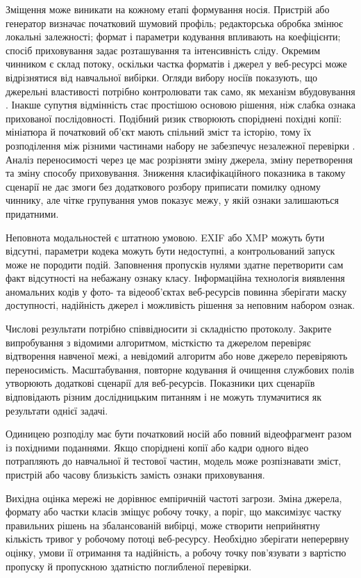 Зміщення може виникати на кожному етапі формування носія. Пристрій або генератор визначає початковий шумовий профіль; редакторська обробка змінює локальні залежності; формат і параметри кодування впливають на коефіцієнти; спосіб приховування задає розташування та інтенсивність сліду. Окремим чинником є склад потоку, оскільки частка форматів і джерел у веб-ресурсі може відрізнятися від навчальної вибірки. Огляди вибору носіїв показують, що джерельні властивості потрібно контролювати так само, як механізм вбудовування \cite{azame2025coverselection,ma2023coverselection}. Інакше супутня відмінність стає простішою основою рішення, ніж слабка ознака прихованої послідовності. Подібний ризик створюють споріднені похідні копії: мініатюра й початковий об’єкт мають спільний зміст та історію, тому їх розподілення між різними частинами набору не забезпечує незалежної перевірки \cite{kiltz2024trace}. Аналіз переносимості через це має розрізняти зміну джерела, зміну перетворення та зміну способу приховування. Зниження класифікаційного показника в такому сценарії не дає змоги без додаткового розбору приписати помилку одному чиннику, але чітке групування умов показує межу, у якій ознаки залишаються придатними.

Неповнота модальностей є штатною умовою. EXIF або XMP можуть бути відсутні, параметри кодека можуть бути недоступні, а контрольований запуск може не породити подій. Заповнення пропусків нулями здатне перетворити сам факт відсутності на небажану ознаку класу. Інформаційна технологія виявлення аномальних кодів у фото- та відеооб’єктах веб-ресурсів повинна зберігати маску доступності, надійність джерел і можливість рішення за неповним набором ознак.

Числові результати потрібно співвідносити зі складністю протоколу. Закрите випробування з відомими алгоритмом, місткістю та джерелом перевіряє відтворення навченої межі, а невідомий алгоритм або нове джерело перевіряють переносимість. Масштабування, повторне кодування й очищення службових полів утворюють додаткові сценарії для веб-ресурсів. Показники цих сценаріїв відповідають різним дослідницьким питанням і не можуть тлумачитися як результати однієї задачі.

Одиницею розподілу має бути початковий носій або повний відеофрагмент разом із похідними поданнями. Якщо споріднені копії або кадри одного відео потрапляють до навчальної й тестової частин, модель може розпізнавати зміст, пристрій або часову близькість замість ознаки приховування.

Вихідна оцінка мережі не дорівнює емпіричній частоті загрози. Зміна джерела, формату або частки класів зміщує робочу точку, а поріг, що максимізує частку правильних рішень на збалансованій вибірці, може створити неприйнятну кількість тривог у робочому потоці веб-ресурсу. Необхідно зберігати неперервну оцінку, умови її отримання та надійність, а робочу точку пов’язувати з вартістю пропуску й пропускною здатністю поглибленої перевірки.

